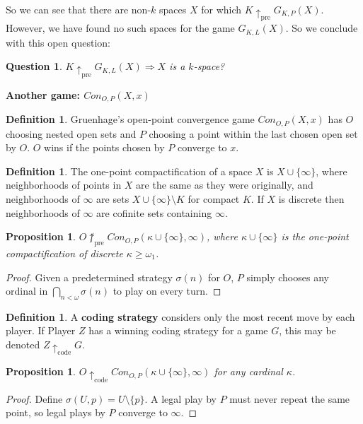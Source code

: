\documentclass[11pt]{article}
\theoremstyle{plain}
\newtheorem{proposition}[theorem]{Proposition}
\newtheorem{question}[theorem]{Question}
\theoremstyle{definition}
\newtheorem{definition}[theorem]{Definition}
\theoremstyle{remark}
\newcommand{\prewin}{\uparrow_{\text{pre}}}
\newcommand{\codewin}{\uparrow_{\text{code}}}
\begin{document}
So we can see that there are non-$k$ spaces $X$ for which $K\prewin G_{K,P}(X)$. However, we have found no such spaces for the game $G_{K,L}(X)$. So we conclude with this open question:

\begin{question}
$K \prewin G_{K,L}(X) \Rightarrow X$ is a $k$-space?
\end{question}

\centerline{\bf Another game: $Con_{O,P}(X,x)$}

\begin{definition} 
Gruenhage's open-point convergence game $Con_{O,P}(X,x)$ has $O$ choosing nested open sets and $P$ choosing a point within the last chosen open set by $O$. $O$ wins if the points chosen by $P$ converge to $x$.
\end{definition}

\begin{definition}
The one-point compactification of a space $X$ is $X\cup\{\infty\}$, where neighborhoods of points in $X$ are the same as they were originally, and neighborhoods of $\infty$ are sets $X\cup\{\infty\}\setminus K$ for compact $K$. If $X$ is discrete then neighborhoods of $\infty$ are cofinite sets containing $\infty$. 
\end{definition}

\begin{proposition}
$O\not\prewin Con_{O,P}(\kappa\cup\{\infty\},\infty)$, where $\kappa\cup\{\infty\}$ is the one-point compactification of discrete $\kappa\geq\omega_1$.
\end{proposition}

\begin{proof}
Given a predetermined strategy $\sigma(n)$ for $O$, $P$ simply chooses any ordinal in $\bigcap_{n<\omega} \sigma(n)$ to play on every turn.
\end{proof}

\begin{definition}
A \textbf{coding strategy} considers only the most recent move by each player. If Player $Z$ has a winning coding strategy for a game $G$, this may be denoted $Z \codewin G$.
\end{definition}

\begin{proposition}
$O\codewin Con_{O,P}(\kappa\cup\{\infty\},\infty)$ for any cardinal $\kappa$. 
\end{proposition}

\begin{proof}
Define $\sigma(U,p)=U\setminus\{p\}$. A legal play by $P$ must never repeat the same point, so legal plays by $P$ converge to $\infty$.
\end{proof}
\end{document}
